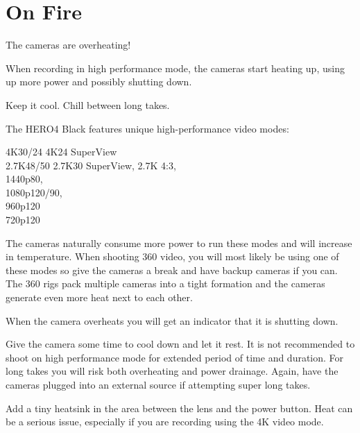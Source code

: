 \chapter{On Fire}
\pagecolor{white}
\label{chap:19}
\begin{fullwidth}


\problem

{\large The cameras are overheating! \par}

When recording in high performance mode, the cameras start heating up, using up more power and possibly shutting down. 


\solution

{\large Keep it cool. Chill between long takes. \par}

The HERO4 Black features unique high-performance video modes: 

4K30/24 4K24 SuperView
\\
2.7K48/50 2.7K30 SuperView, 2.7K 4:3, 
\\
1440p80, 
\\
1080p120/90, 
\\
960p120 
\\
720p120

The cameras naturally consume more power to run these modes and will increase in temperature. When shooting 360 video, you will most likely be using one of these modes so give the cameras a break and have backup cameras if you can. The 360 rigs pack multiple cameras into a tight formation and the cameras generate even more heat next to each other. 

\clearpage
When the camera overheats you will get an indicator that it is shutting down.

                 
Give the camera some time to cool down and let it rest. It is not recommended to shoot on high performance mode for extended period of time and duration. For long takes you will risk both overheating and power drainage. Again, have the cameras plugged into an external source if attempting super long takes. 

\tip Add a tiny heatsink in the area between the lens and the power button. Heat can be a serious issue, especially if you are recording using the 4K video mode.






\clearpage
\end{fullwidth}
